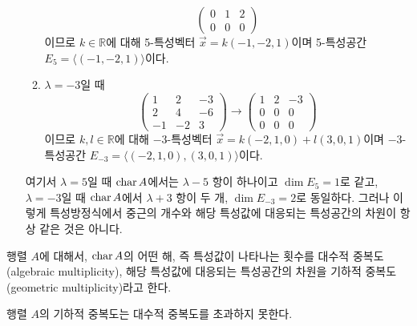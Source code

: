 \documentclass[../engineering_mathematics_lecture_note.tex]{subfiles}
\begin{document}
\begin{example}
\begin{enumerate}
\begin{enumerate}
\begin{equation*}
\begin{pmatrix}
                            0 & 1 & 2\\
                            0 & 0 & 0
                        \end{pmatrix}
                    \end{equation*}
                    이므로 $k \in \mathbb R$에 대해 5-특성벡터 $\vec x = k(-1, -2, 1)$이며 5-특성공간 $E_5 = \langle (-1, -2, 1) \rangle$이다.
                \item $\lambda = -3$일 때
                    \begin{equation*}
                        \begin{pmatrix}
                            1 & 2 & -3\\
                            2 & 4 & -6\\
                            -1 & -2 & 3
                        \end{pmatrix}
                        \rightarrow
                        \begin{pmatrix}
                            1 & 2 & -3\\
                            0 & 0 & 0\\
                            0 & 0 & 0
                        \end{pmatrix}
                    \end{equation*}
                    이므로 $k, l \in \mathbb R$에 대해 $-3$-특성벡터 $\vec x = k(-2, 1, 0) + l(3, 0, 1)$이며 $-3$-특성공간 $E_{-3} = \langle (-2, 1, 0), (3, 0, 1)\rangle$이다.
            \end{enumerate}
            여기서 $\lambda = 5$일 때 $\operatorname{char} A$에서는 $\lambda - 5$ 항이 하나이고 $\dim E_5 = 1$로 같고, $\lambda = -3$일 때 $\operatorname{char} A$에서 $\lambda + 3$ 항이 두 개, $\dim E_{-3} = 2$로 동일하다.
            그러나 이렇게 특성방정식에서 중근의 개수와 해당 특성값에 대응되는 특성공간의 차원이 항상 같은 것은 아니다.
    \end{enumerate}
\end{example}

\begin{definition}
    행렬 $A$에 대해서, $\operatorname{char} A$의 어떤 해, 즉 특성값이 나타나는 횟수를 대수적 중복도(algebraic multiplicity), 해당 특성값에 대응되는 특성공간의 차원을 기하적 중복도(geometric multiplicity)라고 한다.
\end{definition}

\begin{theorem}
    행렬 $A$의 기하적 중복도는 대수적 중복도를 초과하지 못한다.
\end{theorem}
\end{document}
